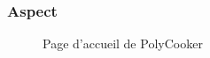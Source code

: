 \documentclass{beamer}
\begin{document}
\begin{frame}
	\frametitle{Aspect}
	\begin{figure}
		\centering
		\caption{Page d'accueil de PolyCooker}
	\end{figure}
\end{frame}
\end{document}
